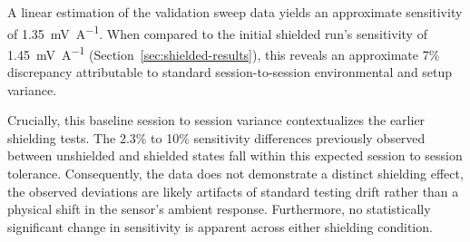 \documentclass[12pt,a4paper]{article}
\begin{document}
\begin{figure}[H]
\begin{minipage}[c]{0.58\textwidth}
        \label{fig:variance-overlay}
    \end{minipage}
    
\end{figure}

A linear estimation of the validation sweep data yields an approximate sensitivity of \SI{1.35}{\milli\volt\per\ampere}. When compared to the initial shielded run's sensitivity of \SI{1.45}{\milli\volt\per\ampere} (Section~\ref{sec:shielded-results}), this reveals an approximate 7\% discrepancy attributable to standard session-to-session environmental and setup variance.

Crucially, this baseline session to session variance contextualizes the earlier shielding tests. The 2.3\% to 10\% sensitivity differences previously observed between unshielded and shielded states fall within this expected session to session tolerance. Consequently, the data does not demonstrate a distinct shielding effect, the observed deviations are likely artifacts of standard testing drift rather than a physical shift in the sensor's ambient response. Furthermore, no statistically significant change in sensitivity is apparent across either shielding condition.
\end{document}

